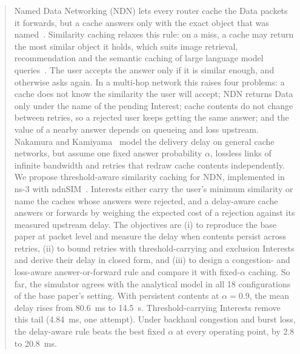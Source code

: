 \documentclass[11pt,a4paper]{article}
\begin{document}
\setcounter{page}{1}
\begin{abstract}
Named Data Networking (NDN) lets every router cache the Data packets it forwards, but a cache
answers only with the exact object that was named~\cite{zhang2014ndn}. Similarity caching relaxes
this rule: on a miss, a cache may return the most similar object it holds, which suits image
retrieval, recommendation and the semantic caching of large language model
queries~\cite{neglia2022similarity,schroeder2025vcache}. The user accepts the answer only if it is
similar enough, and otherwise asks again. In a multi-hop network this raises four problems: a cache
does not know the similarity the user will accept; NDN returns Data only under the name of the
pending Interest; cache contents do not change between retries, so a rejected user keeps getting
the same answer; and the value of a nearby answer depends on queueing and loss upstream. Nakamura
and Kamiyama~\cite{nakamura2024analysis} model the delivery delay on general cache networks, but
assume one fixed answer probability $\alpha$, lossless links of infinite bandwidth and retries that
redraw cache contents independently. We propose threshold-aware similarity caching for NDN,
implemented in ns-3 with ndnSIM~\cite{mastorakis2017ndnsim}. Interests either carry the user's
minimum similarity or name the caches whose answers were rejected, and a delay-aware cache answers
or forwards by weighing the expected cost of a rejection against its measured upstream delay. The
objectives are (i) to reproduce the base paper at packet level and measure the delay when contents
persist across retries, (ii) to bound retries with threshold-carrying and exclusion Interests and
derive their delay in closed form, and (iii) to design a congestion- and loss-aware answer-or-forward
rule and compare it with fixed-$\alpha$ caching. So far, the simulator agrees with the analytical
model in all 18 configurations of the base paper's setting. With persistent contents at
$\alpha = 0.9$, the mean delay rises from 80.6~ms to 14.5~s. Threshold-carrying Interests remove
this tail (4.84~ms, one attempt). Under backhaul congestion and burst loss, the delay-aware rule
beats the best fixed $\alpha$ at every operating point, by 2.8 to 20.8~ms.
\end{abstract}
\end{document}

